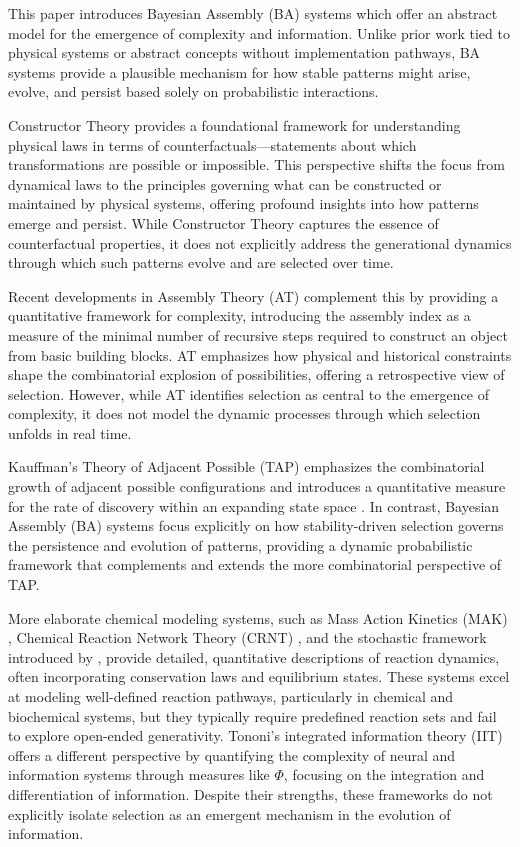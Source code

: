 \documentclass[entropy,article,submit,pdftex,moreauthors]{Definitions/mdpi}
\begin{document}
This paper introduces Bayesian Assembly (BA) systems which offer an abstract model for the emergence of complexity and information. Unlike prior work tied to physical systems or abstract concepts without implementation pathways, BA systems provide a plausible mechanism for how stable patterns might arise, evolve, and persist based solely on probabilistic interactions.

Constructor Theory \cite{deutsch2013constructor} provides a foundational framework for understanding physical laws in terms of counterfactuals—statements about which transformations are possible or impossible. This perspective shifts the focus from dynamical laws to the principles governing what can be constructed or maintained by physical systems, offering profound insights into how patterns emerge and persist. While Constructor Theory captures the essence of counterfactual properties, it does not explicitly address the generational dynamics through which such patterns evolve and are selected over time.

Recent developments in Assembly Theory (AT) \cite{walker2023nature} complement this by providing a quantitative framework for complexity, introducing the assembly index as a measure of the minimal number of recursive steps required to construct an object from basic building blocks. AT emphasizes how physical and historical constraints shape the combinatorial explosion of possibilities, offering a retrospective view of selection. However, while AT identifies selection as central to the emergence of complexity, it does not model the dynamic processes through which selection unfolds in real time.

Kauffman’s Theory of Adjacent Possible (TAP) emphasizes the combinatorial growth of adjacent possible configurations and introduces a quantitative measure for the rate of discovery within an expanding state space \cite{kauffman2024tap}. In contrast, Bayesian Assembly (BA) systems focus explicitly on how stability-driven selection governs the persistence and evolution of patterns, providing a dynamic probabilistic framework that complements and extends the more combinatorial perspective of TAP.

More elaborate chemical modeling systems, such as Mass Action Kinetics (MAK) \cite{TuranyiTomlin2014}, Chemical Reaction Network Theory (CRNT) \cite{feinberg1987chemical}, and the stochastic framework introduced by \cite{arxiv:q-bio0501016}, provide detailed, quantitative descriptions of reaction dynamics, often incorporating conservation laws and equilibrium states. These systems excel at modeling well-defined reaction pathways, particularly in chemical and biochemical systems, but they typically require predefined reaction sets and fail to explore open-ended generativity. Tononi's integrated information theory (IIT) \cite{tononi2008phi} offers a different perspective by quantifying the complexity of neural and information systems through measures like $\Phi$, focusing on the integration and differentiation of information. Despite their strengths, these frameworks do not explicitly isolate selection as an emergent mechanism in the evolution of information.
\end{document}
